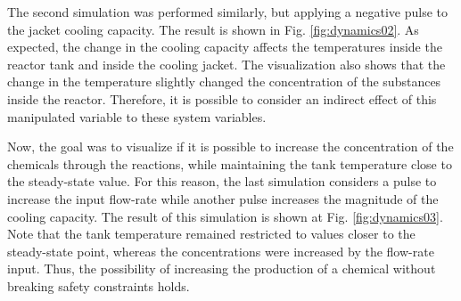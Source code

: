 \documentclass[a4paper,11pt]{book}
\numberwithin{figure}{chapter}
\numberwithin{equation}{chapter}
\numberwithin{table}{chapter}
\theoremstyle{definition}
\begin{document}
The second simulation was performed similarly, but applying a negative pulse to the jacket cooling capacity. The result is shown in Fig. \ref{fig:dynamics02}. As expected, the change in the cooling capacity affects the temperatures inside the reactor tank and inside the cooling jacket. The visualization also shows that the change in the temperature slightly changed the concentration of the substances inside the reactor. Therefore, it is possible to consider an indirect effect of this manipulated variable to these system variables.

Now, the goal was to visualize if it is possible to increase the concentration of the chemicals through the reactions, while maintaining the tank temperature close to the steady-state value. For this reason, the last simulation considers a pulse to increase the input flow-rate while another pulse increases the magnitude of the cooling capacity. The result of this simulation is shown at Fig. \ref{fig:dynamics03}. Note that the tank temperature remained restricted to values closer to the steady-state point, whereas the concentrations were increased by the flow-rate input. Thus, the possibility of increasing the production of a chemical without breaking safety constraints holds.
\end{document}
